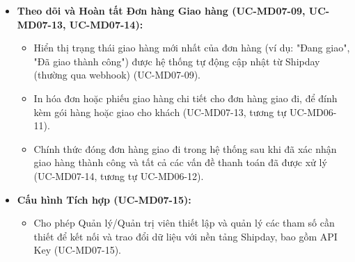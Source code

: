 \begin{itemize}
    \item \textbf{Theo dõi và Hoàn tất Đơn hàng Giao hàng (UC-MD07-09, UC-MD07-13, UC-MD07-14):}
    \begin{itemize}
        \item Hiển thị trạng thái giao hàng mới nhất của đơn hàng (ví dụ: "Đang giao", "Đã giao thành công") được hệ thống tự động cập nhật từ Shipday (thường qua webhook) (UC-MD07-09).
        \item In hóa đơn hoặc phiếu giao hàng chi tiết cho đơn hàng giao đi, để đính kèm gói hàng hoặc giao cho khách (UC-MD07-13, tương tự UC-MD06-11).
        \item Chính thức đóng đơn hàng giao đi trong hệ thống sau khi đã xác nhận giao hàng thành công và tất cả các vấn đề thanh toán đã được xử lý (UC-MD07-14, tương tự UC-MD06-12).
    \end{itemize}

    \item \textbf{Cấu hình Tích hợp (UC-MD07-15):}
    \begin{itemize}
        \item Cho phép Quản lý/Quản trị viên thiết lập và quản lý các tham số cần thiết để kết nối và trao đổi dữ liệu với nền tảng Shipday, bao gồm API Key (UC-MD07-15).
    \end{itemize}
\end{itemize}

